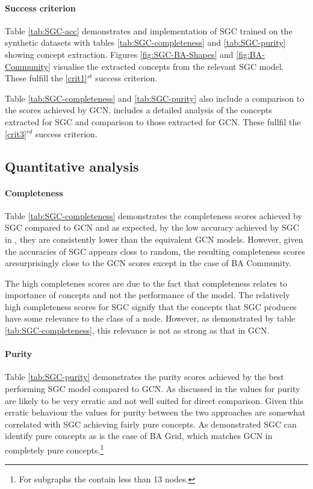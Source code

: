 \paragraph{Success criterion}
Table \ref{tab:SGC-acc} demonstrates and implementation of SGC trained on the synthetic datasets with tables \ref{tab:SGC-completeness} and \ref{tab:SGC-purity} showing concept extraction.
Figures \ref{fig:SGC-BA-Shapes} and \ref{fig:BA-Community} visualise the extracted concepts from the relevant SGC model. These fulfill the \ref{crit1}$^{st}$ success criterion.

Table \ref{tab:SGC-completeness} and \ref{tab:SGC-purity} also include a comparison to the scores achieved by GCN.
 includes a detailed analysis of the concepts extracted for SGC and comparison to those extracted for GCN.
These fullfil the \ref{crit3}$^{rd}$ success criterion.

\subsection{Quantitative analysis}
\label{sec:quant}
\paragraph{Completeness}


Table \ref{tab:SGC-completeness} demonstrates the completeness scores achieved by SGC compared to GCN and as expected, by the low accuracy achieved by SGC in , they are consistently lower than the equivalent GCN models.
However, given the accuracies of SGC appears closs to random, the resulting completeness scores aresurprisingly close to the GCN scores except in the case of BA Community.

The high completenes scores are due to the fact that completeness relates to importance of concepts and not the performance of the model.
The relatively high completeness scores for SGC signify that the concepts that SGC produces have some relevance to the class of a node.
However, as demonstrated by table \ref{tab:SGC-completeness}, this relevance is not as strong as that in GCN.

\paragraph{Purity}


Table \ref{tab:SGC-purity} demonstrates the purity scores achieved by the best performing SGC model compared to GCN.
As discussed in  the values for purity are likely to be very erratic and not well suited for direct comparison.
Given this erratic behaviour the values for purity between the two approaches are somewhat correlated with SGC achieving fairly pure concepts.
As demonstrated SGC can identify pure concepts as is the case of BA Grid, which matches GCN in completely pure concepts.\footnote{For subgraphs the contain less than 13 nodes.}

